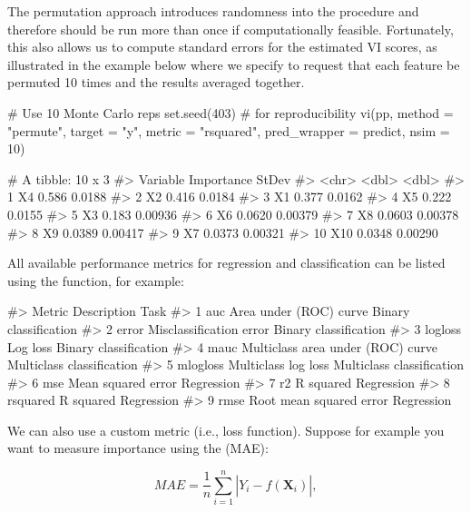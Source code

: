 The permutation approach introduces randomness into the procedure and therefore should be run more than once if computationally feasible. Fortunately, this also allows us to compute standard errors for the estimated VI scores, as illustrated in the example below where we specify  to request that each feature be permuted 10 times and the results averaged together.

\begin{example}
# Use 10 Monte Carlo reps
set.seed(403)  # for reproducibility
vi(pp, method = "permute", target = "y", metric = "rsquared",
   pred_wrapper = predict, nsim = 10)

# A tibble: 10 x 3
#>    Variable Importance   StDev
#>    <chr>         <dbl>   <dbl>
#>  1 X4           0.586  0.0188 
#>  2 X2           0.416  0.0184 
#>  3 X1           0.377  0.0162 
#>  4 X5           0.222  0.0155 
#>  5 X3           0.183  0.00936
#>  6 X6           0.0620 0.00379
#>  7 X8           0.0603 0.00378
#>  8 X9           0.0389 0.00417
#>  9 X7           0.0373 0.00321
#> 10 X10          0.0348 0.00290
\end{example}

All available performance metrics for regression and classification can be listed using the  function, for example:

\begin{example}
#>     Metric                       Description                      Task
#> 1      auc            Area under (ROC) curve     Binary classification
#> 2    error           Misclassification error     Binary classification
#> 3  logloss                          Log loss     Binary classification
#> 4     mauc Multiclass area under (ROC) curve Multiclass classification
#> 5 mlogloss               Multiclass log loss Multiclass classification
#> 6      mse                Mean squared error                Regression
#> 7       r2                         R squared                Regression
#> 8 rsquared                         R squared                Regression
#> 9     rmse           Root mean squared error                Regression
\end{example}

We can also use a custom metric (i.e., loss function). Suppose for example you want to measure importance using the  (MAE): 

\begin{equation}
  MAE = \frac{1}{n}\sum_{i = 1}^n\left|Y_i - \widehat{f}\left(\boldsymbol{X}_i\right)\right|,
\end{equation}

